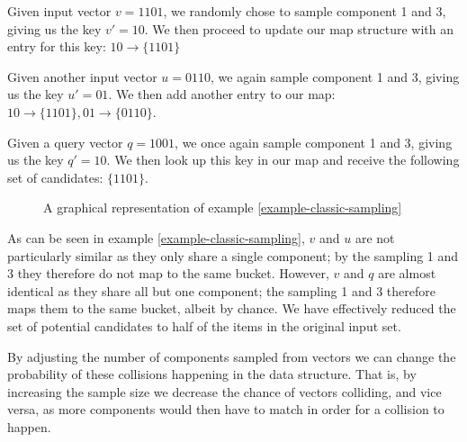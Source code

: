 \begin{example}
\label{example-classic-sampling}
Given input vector $v = 1101$, we randomly chose to sample component 1 and 3, giving us the key $v' = 10$. We then proceed to update our map structure with an entry for this key: $10 \rightarrow \{1101\}$

Given another input vector $u = 0110$, we again sample component 1 and 3, giving us the key $u' = 01$. We then add another entry to our map: $10 \rightarrow \{1101\}, 01 \rightarrow \{0110\}$.

Given a query vector $q = 1001$, we once again sample component 1 and 3, giving us the key $q' = 10$. We then look up this key in our map and receive the following set of candidates: $\{1101\}$.
\end{example}

\begin{figure}
  \centering

  \caption{A graphical representation of example \ref{example-classic-sampling}}
  \label{figure-classic-sampling}
\end{figure}

As can be seen in example \ref{example-classic-sampling}, $v$ and $u$ are not particularly similar as they only share a single component; by the sampling 1 and 3 they therefore do not map to the same bucket. However, $v$ and $q$ are almost identical as they share all but one component; the sampling 1 and 3 therefore maps them to the same bucket, albeit by chance. We have effectively reduced the set of potential candidates to half of the items in the original input set.

By adjusting the number of components sampled from vectors we can change the probability of these collisions happening in the data structure. That is, by increasing the sample size we decrease the chance of vectors colliding, and vice versa, as more components would then have to match in order for a collision to happen.

